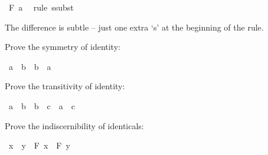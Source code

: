 \begin{isabellebody}
\ {\isachardoublequoteopen}F\ a{\isachardoublequoteclose}\ \isamarkupfalse%
\ {\isacharparenleft}rule\ ssubst{\isacharparenright}\isanewline
\ \ \isamarkupfalse%
\isanewline
{}\isamarkupfalse%
%
\endisatagproof
{\isafoldproof}%
%
\isadelimproof
%
\endisadelimproof
%
\begin{isamarkuptext}%
The difference is subtle -- just one extra `s' at the beginning of the rule.%
\end{isamarkuptext}\isamarkuptrue%
%
\begin{isamarkuptext}%
\begin{Exercise}[label = symmetry] Prove the symmetry of identity: \end{Exercise}%
\end{isamarkuptext}\isamarkuptrue%
\isamarkupfalse%
\ {\isachardoublequoteopen}a\ {\isacharequal}\ b\ {\isasymlongrightarrow}\ b\ {\isacharequal}\ a{\isachardoublequoteclose}%
\isadelimproof
\ %
\endisadelimproof
%
\isatagproof
{}\isamarkupfalse%
%
\endisatagproof
{\isafoldproof}%
%
\isadelimproof
%
\endisadelimproof
%
\begin{isamarkuptext}%
\begin{Exercise} Prove the transitivity of identity: \end{Exercise}%
\end{isamarkuptext}\isamarkuptrue%
\isamarkupfalse%
\ {\isachardoublequoteopen}a\ {\isacharequal}\ b\ {\isasymlongrightarrow}\ b\ {\isacharequal}\ c\ {\isasymlongrightarrow}\ a\ {\isacharequal}\ c{\isachardoublequoteclose}%
\isadelimproof
\ %
\endisadelimproof
%
\isatagproof
{}\isamarkupfalse%
%
\endisatagproof
{\isafoldproof}%
%
\isadelimproof
%
\endisadelimproof
%
\begin{isamarkuptext}%
\begin{Exercise}[title = The Indiscernibility of Identity] Prove the indiscernibility of identicals: \end{Exercise}%
\end{isamarkuptext}\isamarkuptrue%
\isamarkupfalse%
\ {\isachardoublequoteopen}x\ {\isacharequal}\ y\ {\isasymlongrightarrow}\ {\isacharparenleft}F\ x\ {\isasymlongleftrightarrow}\ F\ y{\isacharparenright}{\isachardoublequoteclose}%
\isadelimproof
\ %
\endisadelimproof
%
\isatagproof
{}\isamarkupfalse%
%
\endisatagproof
{\isafoldproof}%
%
\isadelimproof
%
\endisadelimproof
%
\isamarkuptrue%
%
\begin{isamarkuptext}%

\end{isamarkuptext}
\end{isabellebody}
